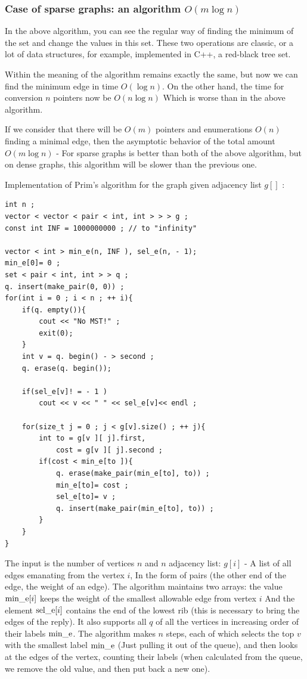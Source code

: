 \subsubsection{ Case of sparse graphs: an algorithm $O (m \log n)$}

In the above algorithm, you can see the regular way of finding the minimum of the set and change the values ​​in this set. These two operations are classic, or a lot of data structures, for example, implemented in C++, a red-black tree set.

Within the meaning of the algorithm remains exactly the same, but now we can find the minimum edge in time $O (\log n)$. On the other hand, the time for conversion $n$ pointers now be $O (n \log n)$ Which is worse than in the above algorithm.

If we consider that there will be $O (m)$ pointers and enumerations $O (n)$ finding a minimal edge, then the asymptotic behavior of the total amount $O (m \log n)$ - For sparse graphs is better than both of the above algorithm, but on dense graphs, this algorithm will be slower than the previous one.

Implementation of Prim's algorithm for the graph given adjacency list $g []$ :

\begin{verbatim}
int n ;
vector < vector < pair < int, int > > > g ;
const int INF = 1000000000 ; // to "infinity"
 
vector < int > min_e(n, INF ), sel_e(n, - 1);
min_e[0]= 0 ;
set < pair < int, int > > q ;
q. insert(make_pair(0, 0)) ;
for(int i = 0 ; i < n ; ++ i){
    if(q. empty()){
        cout << "No MST!" ;
        exit(0);
    }
    int v = q. begin() - > second ;
    q. erase(q. begin());
 
    if(sel_e[v]! = - 1 )
        cout << v << " " << sel_e[v]<< endl ;
 
    for(size_t j = 0 ; j < g[v].size() ; ++ j){
        int to = g[v ][ j].first,
            cost = g[v ][ j].second ;
        if(cost < min_e[to ]){
            q. erase(make_pair(min_e[to], to)) ;
            min_e[to]= cost ;
            sel_e[to]= v ;
            q. insert(make_pair(min_e[to], to)) ;
        }
    }
} 
\end{verbatim}
The input is the number of vertices $n$ and $n$ adjacency list: $g [i]$ - A list of all edges emanating from the vertex $i$, In the form of pairs (the other end of the edge, the weight of an edge). The algorithm maintains two arrays: the value ${\rm min \_e} [i]$ keeps the weight of the smallest allowable edge from vertex $i$ And the element ${\rm sel \_e} [i]$ contains the end of the lowest rib (this is necessary to bring the edges of the reply). It also supports all $q$ of all the vertices in increasing order of their labels ${\rm min \_e}$. The algorithm makes $n$ steps, each of which selects the top $v$ with the smallest label ${\rm min \_e}$ (Just pulling it out of the queue), and then looks at the edges of the vertex, counting their labels (when calculated from the queue, we remove the old value, and then put back a new one).

